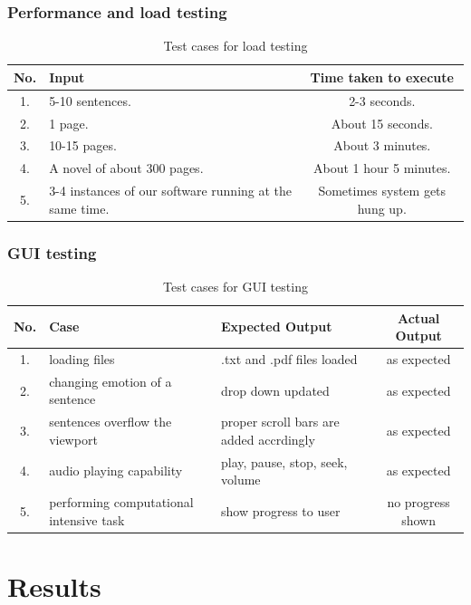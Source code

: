 \documentclass[oneside,a4paper,12pt]{book}
\begin{document}
\subsection{Performance and load testing}   
\begin{table}[!htbp]
	\def\arraystretch{1.5}
	\begin{tabularx}{\textwidth}{|c|X|c|}
		\hline 
		No. & Input	& Time taken to execute \\ \hline
		1. & 5-10 sentences. & 2-3 seconds. \\ \hline
		2. & 1 page. & About 15 seconds. \\ \hline
		3. & 10-15 pages. & About 3 minutes. \\ \hline
		4. & A novel of about 300 pages. & About 1 hour 5 minutes. \\ \hline
		5. & 3-4 instances of our software running at the same time. & Sometimes system gets hung up. \\ \hline
	\end{tabularx}
	\caption{Test cases for load testing}
	\label{tab:testcases}
\end{table}

\newpage
\subsection{GUI testing}
\begin{table}[!htbp]
	\def\arraystretch{1.5}
	\begin{tabularx}{\textwidth}{|c|X|X|c|}
		\hline 
		No. & Case	& Expected Output & Actual Output \\ \hline
		1. & loading files & .txt and .pdf files loaded & as expected \\ \hline
		2. & changing emotion of a sentence & drop down updated & as expected \\ \hline
		3. & sentences overflow the viewport & proper scroll bars are added accrdingly & as expected \\ \hline
		4. & audio playing capability & play, pause, stop, seek, volume & as expected \\ \hline
		5. & performing computational intensive task & show progress to user & no progress shown \\ \hline
	\end{tabularx}
	\caption{Test cases for GUI testing}
	\label{tab:testcases}
\end{table}

\chapter{Results}
\end{document}

